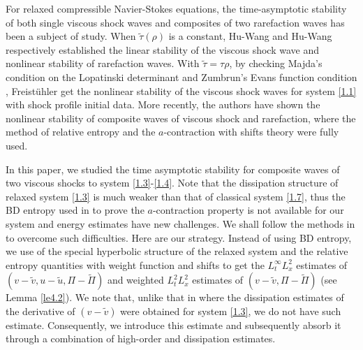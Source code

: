 \documentclass[10pt,reqno]{amsart}
\numberwithin{equation}{section}
\begin{document}

For relaxed compressible Navier-Stokes equations, the time-asymptotic stability of both single viscous shock waves and composites of two rarefaction waves has been a subject of study. When $\tilde \tau(\rho)$ is a constant, Hu-Wang \cite{ZWH} and Hu-Wang \cite{XFH} respectively established the linear stability of the viscous shock wave and nonlinear stability of rarefaction waves. With $\tilde \tau=\tau \rho$, by checking Majda's condition on the Lopatinski determinant and Zumbrun's Evans function condition \cite{MZ, MZ2, PZ},  Freist\"uhler \cite{FRE1} get the nonlinear stability of the viscous shock waves for system \eqref{1.1} with shock profile initial data. More recently, the authors \cite{HG} have shown the nonlinear stability of composite waves of viscous shock and rarefaction, where the method of relative entropy and the $a$-contraction with shifts theory were fully used.

In this paper, we studied the time asymptotic stability for composite waves of two viscous shocks to system \eqref{1.3}-\eqref{1.4}. Note that the dissipation structure of relaxed system \eqref{1.3} is much weaker than that of classical system \eqref{1.7}, thus the BD entropy used in \cite{WY, SMJ} to prove the $a$-contraction property is not available for our system and energy estimates have new challenges. We shall follow the methods in \cite{HG} to overcome such difficulties. Here are our strategy. Instead of using BD entropy, we use of the special  hyperbolic structure of the relaxed system and the relative entropy quantities with weight function and shifts to get the $L^\infty_tL^2_x$ estimates of $(v-\widetilde v, u-\widetilde u, \Pi-\widetilde \Pi)$ and weighted $L^2_tL^2_x$ estimates of $(v-\widetilde v, \Pi-\widetilde \Pi)$ (see Lemma \ref{le4.2}).  We note that, unlike that in \cite{WY,SMJ}  where the dissipation estimates of  the derivative of $(v-\widetilde v)$ were obtained for system \eqref{1.3}, we do not have such estimate. Consequently, we introduce this estimate and subsequently absorb it through a combination of high-order and dissipation estimates.
\end{document}
